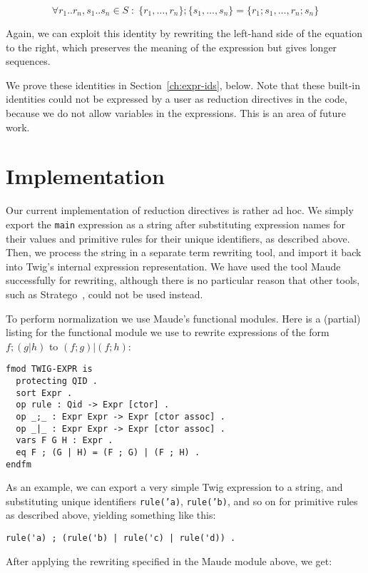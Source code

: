\[
\forall r_1..r_n,s_1..s_n \in S \;:\;
\{r_1,\ldots,r_n\};\{s_1,\ldots,s_n\} = \{r_1;s_1,\ldots,r_n;s_n\}
\]

Again, we can exploit this identity by rewriting the left-hand
side of the equation to the right, which preserves the meaning of
the expression but gives longer sequences.

We prove these identities in Section~\ref{ch:expr-ids},
below. Note that these built-in identities could not be expressed
by a user as reduction directives in the code, because we do not
allow variables in the expressions. This is an area of future
work.

\section{Implementation}
\label{sec:red:impl}

Our current implementation of reduction directives is rather ad
hoc. We simply export the \texttt{main} expression as a string
after substituting expression names for their values and primitive
rules for their unique identifiers, as described above. Then, we
process the string in a separate term rewriting tool, and import
it back into Twig's internal expression representation. We have
used the tool Maude~\cite{maude} successfully for rewriting,
although there is no particular reason that other tools, such as
Stratego~\cite{stratego}, could not be used instead.

To perform normalization we use Maude's functional modules. Here
is a (partial) listing for the functional module we use to rewrite
expressions of the form $f;(g|h)$ to $(f;g)|(f;h)$:

\begin{verbatim}
fmod TWIG-EXPR is
  protecting QID .
  sort Expr .
  op rule : Qid -> Expr [ctor] .
  op _;_ : Expr Expr -> Expr [ctor assoc] .
  op _|_ : Expr Expr -> Expr [ctor assoc] .
  vars F G H : Expr .
  eq F ; (G | H) = (F ; G) | (F ; H) .
endfm
\end{verbatim}

As an example, we can export a very simple Twig expression to a
string, and substituting unique identifiers \texttt{rule('a)},
\texttt{rule('b)}, and so on for primitive rules as described
above, yielding something like this:

\begin{verbatim}
rule('a) ; (rule('b) | rule('c) | rule('d)) .
\end{verbatim}

After applying the rewriting specified in the Maude module above,
we get:

